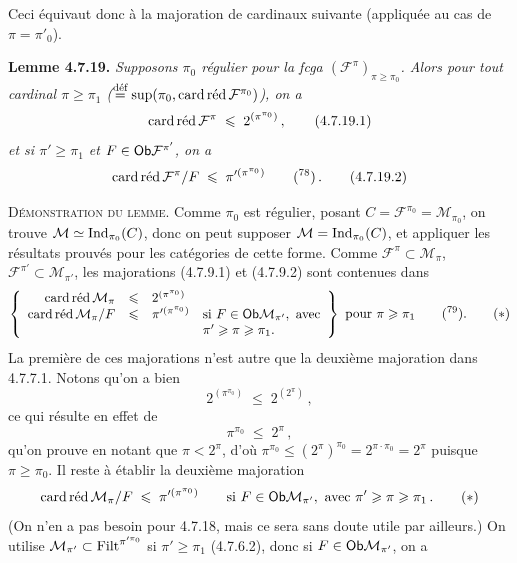 Ceci équivaut donc à la majoration de cardinaux suivante (appliquée au cas de $\pi=\pi'_0$).

\textbf{Lemme 4.7.19.} \textit{Supposons $\pi_0$ régulier pour la fcga $(\mathcal{F}^{\pi})_{\pi\geqslant\pi_0}$. Alors pour tout cardinal $\pi\geqslant\pi_1$ ($\overset{\text{déf}}{=}\sup(\pi_0,\mathop{\textup{card\,réd}}\nolimits\mathcal{F}^{\pi_0})$), on a}
\[
\cardred\mathcal{F}^{\pi} \;\leqslant\; 2^{(\pi^{\pi_0})} \, , \tag*{(4.7.19.1)}
\]
\textit{et si $\pi'\geqslant\pi_1$ et $F\in\mathsf{Ob}\mathcal{F}^{\pi'}$, on a}
\[
\cardred\mathcal{F}^{\pi}/F \;\leqslant\; \pi'^{(\pi^{\pi_0})} \qquad \text{(\footnotemark[78])} \, . \tag*{(4.7.19.2)}
\]

\noindent{}\textsc{Démonstration du lemme}. Comme $\pi_0$ est régulier, posant $C=\mathcal{F}^{\pi_0}=\mathcal{M}_{\pi_0}$, on trouve $\mathcal{M}\simeq\operatorname{Ind}_{\pi_0}(C)$, donc on peut supposer $\mathcal{M}=\operatorname{Ind}_{\pi_0}(C)$, et appliquer les résultats prouvés pour les catégories de cette forme. Comme $\mathcal{F}^{\pi}\subset\mathcal{M}_\pi$, $\mathcal{F}^{\pi'}\subset\mathcal{M}_{\pi'}$, les majorations (4.7.9.1) et (4.7.9.2) sont contenues dans %
\[
\left\{
\begin{array}{rcll}
\cardred\mathcal{M}_\pi & \leqslant & 2^{(\pi^{\pi_0})} & \\
\cardred\mathcal{M}_\pi/F & \leqslant & \pi'^{(\pi^{\pi_0})} & \text{si } F\in\Ob\mathcal{M}_{\pi'},\ \text{avec}\\
 & & & \pi'\geqslant\pi\geqslant\pi_1.
\end{array}
\right\}
\ \text{pour } \pi\geqslant\pi_1 \qquad \text{(\footnotemark[79])}. \tag*{$(*)$}
\]
La première de ces majorations n'est autre que la deuxième majoration dans 4.7.7.1. Notons qu'on a bien
\[
2^{(\pi^{\pi_0})} \;\leqslant\; 2^{(2^{\pi})} \, ,
\]
ce qui résulte en effet de
\[
\pi^{\pi_0} \;\leqslant\; 2^{\pi} \, ,
\]
qu'on prouve en notant que $\pi<2^{\pi}$, d'où $\pi^{\pi_0}\leqslant(2^{\pi})^{\pi_0}=2^{\pi\cdot\pi_0}=2^{\pi}$ puisque $\pi\geqslant\pi_0$. Il reste à établir la deuxième majoration
\[
\cardred\mathcal{M}_\pi/F \;\leqslant\; \pi'^{(\pi^{\pi_0})} \qquad \text{si } F\in\Ob\mathcal{M}_{\pi'},\ \text{avec } \pi'\geqslant\pi\geqslant\pi_1 \, . \tag*{$(*)$}
\]
(On n'en a pas besoin pour 4.7.18, mais ce sera sans doute utile par ailleurs.) On utilise $\mathcal{M}_{\pi'}\subset\mathrm{Filt}^{\pi'^{\pi_0}}$ si $\pi'\geqslant\pi_1$ (4.7.6.2), donc si $F\in\mathsf{Ob}\mathcal{M}_{\pi'}$, on a

